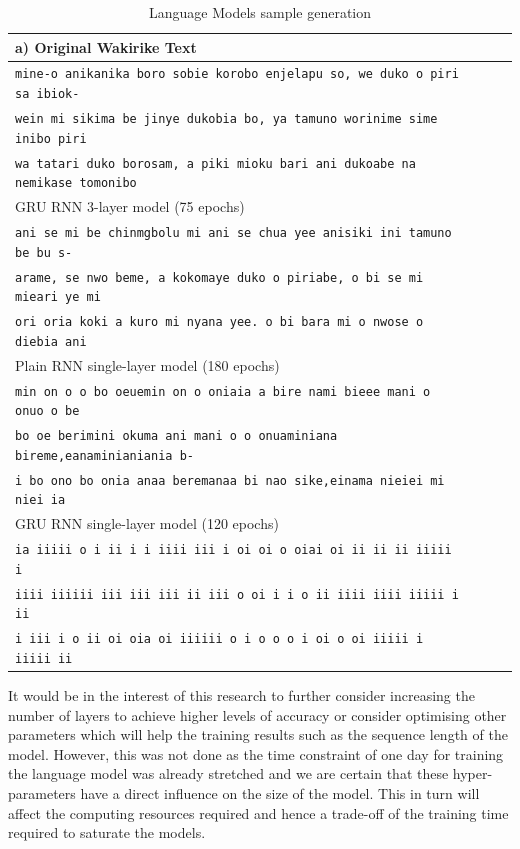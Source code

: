 \begin{table}
  \caption{Language Models sample generation}
  \label{tab6_1:LMX}
\begin{tabular}{lrrr}
\toprule
a) Original Wakirike Text \\
\midrule
\texttt{mine-o anikanika boro sobie korobo enjelapu so, we duko o piri sa ibiok-}\\
\texttt{wein mi sikima be jinye dukobia bo, ya tamuno worinime sime inibo piri} \\
\texttt{wa tatari duko borosam, a piki mioku bari ani dukoabe na nemikase tomonibo}\\
\midrule
GRU RNN 3-layer model (75 epochs) \\
\midrule
 \texttt{ani se mi be chinmgbolu mi ani se chua yee anisiki ini tamuno be bu s-}\\
\texttt{arame, se nwo beme, a kokomaye duko o piriabe, o bi se mi mieari ye mi} \\
\texttt{ori oria koki a kuro mi nyana yee. o bi bara mi o nwose o diebia  ani} \\
 \midrule
Plain RNN single-layer model (180 epochs) \\
\midrule
\texttt{min on o o bo oeuemin on o oniaia a bire nami bieee mani o onuo o be} \\
\texttt{bo oe berimini okuma ani mani o o onuaminiana bireme,eanaminianiania b-} \\
\texttt{i bo ono bo onia anaa beremanaa bi nao sike,einama nieiei mi niei ia } \\
\midrule
GRU RNN single-layer model (120 epochs) \\
\midrule
\texttt{ia iiiii  o i ii i i iiii  iii i oi oi o oiai  oi ii ii ii  iiiii  i} \\
\texttt{iiii iiiiii  iii iii iii  ii iii  o oi i i o ii iiii  iiii  iiiii i ii} \\
\texttt{i iii i o ii oi oia  oi iiiiii  o i o o o i oi o oi iiiii i iiiii  ii} \\
\bottomrule
\end{tabular}
\end{table}



It would be in the interest of this research to further consider increasing the number of layers to achieve higher levels of accuracy or consider optimising other parameters which will help the training results such as the sequence length of the model.  However, this was not done as the time constraint of one day for training the language model was already stretched and we are certain that these hyper-parameters have a direct influence on the size of the model.  This in turn will affect the computing resources required and hence a trade-off of the training time required to saturate the models.
\stopblue


